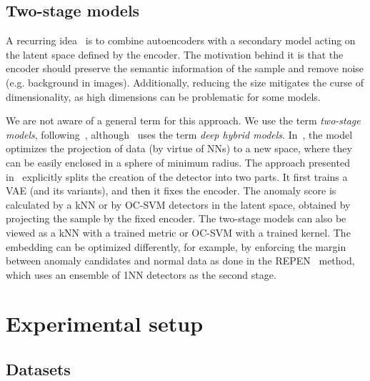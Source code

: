 \subsection{Two-stage models}
A recurring idea~\cite{ergen2017unsupervised, yaoUnsupervisedAnomalyDetection2019, ruff2018deep, vskvara2020detection} is to combine autoencoders with a secondary model acting on the latent space defined by the encoder. The motivation behind it is that the encoder should preserve the semantic information of the sample and remove noise (e.g. background in images). Additionally, reducing the size mitigates the curse of dimensionality, as high dimensions can be problematic for some models.

We are not aware of a general term for this approach. We use the term \textit{two-stage models}, following~\cite{dai2019diagnosing}, although~\cite{chalapathy2019deep} uses the term \textit{deep hybrid models}. In~\cite{ruff2018deep}, the model optimizes the projection of data (by virtue of NNs) to a new space, where they can be easily enclosed in a sphere of minimum radius. The approach presented in~\cite{vskvara2020detection, yaoUnsupervisedAnomalyDetection2019} explicitly splits the creation of the detector into two parts. It first trains a VAE (and its variants), and then it fixes the encoder. The anomaly score is calculated by a kNN \cite{vskvara2020detection} or by OC-SVM \cite{yaoUnsupervisedAnomalyDetection2019} detectors in the latent space, obtained by projecting the sample by the fixed encoder. The two-stage models can also be viewed as a kNN with a trained metric or OC-SVM with a trained kernel. The embedding can be optimized differently, for example, by enforcing the margin between anomaly candidates and normal data as done in the REPEN~\cite{pangLearningRepresentationsUltrahighdimensional2018} method, which uses an ensemble of 1NN detectors as the second stage.

\section{Experimental setup}
\label{sec:experimentalsetup}
\subsection{Datasets}

